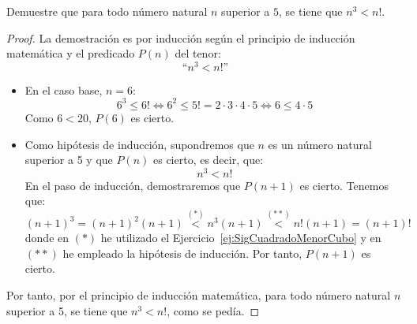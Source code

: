 \begin{ejercicio}
    Demuestre que para todo número natural $n$ superior a $5$, se tiene que $n^3<n!$.

    \begin{proof}
        La demostración es por inducción según el principio de inducción matemática y el predicado $P(n)$ del tenor:
    \begin{equation*}
        \text{``}n^3<n!\text{''}
    \end{equation*}

    \begin{itemize}
        \item En el caso base, $n=6$:
            \begin{equation*}
                6^3 \leq 6! \Longleftrightarrow 6^2\leq 5!=2\cdot 3\cdot 4\cdot 5 \Longleftrightarrow 6 \leq 4\cdot 5
            \end{equation*}
            Como $6 < 20$, $P(6)$ es cierto.

        \item Como hipótesis de inducción, supondremos que $n$ es un número natural superior a 5 y que $P(n)$ es cierto, es decir, que:
            \begin{equation*}
                n^3<n!
            \end{equation*}
            En el paso de inducción, demostraremos que $P(n+1)$ es cierto. Tenemos que:
            \begin{equation*}
                (n+1)^3 = (n+1)^2(n+1) \stackrel{(\ast)}{<{}} n^3(n+1) \stackrel{(\ast\ast)}{<{}} n!(n+1) = (n+1)!
            \end{equation*}
            donde en $(\ast)$ he utilizado el Ejercicio~\ref{ej:SigCuadradoMenorCubo} y en $(\ast\ast)$ he empleado la hipótesis de inducción.
            Por tanto, $P(n+1)$ es cierto.
    \end{itemize}
    Por tanto, por el principio de inducción matemática, para todo número natural $n$ superior a 5, se tiene que $n^3<n!$, como se pedía.
    \end{proof}
\end{ejercicio}

